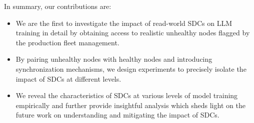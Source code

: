 In summary, our contributions are:
\begin{itemize}
    \item We are the first to investigate the impact of read-world SDCs on LLM training in detail by obtaining access to realistic unhealthy nodes flagged by the production fleet management.
    \item By pairing unhealthy nodes with healthy nodes and introducing synchronization mechanisms, we design experiments to precisely isolate the impact of SDCs at different levels.
    \item We reveal the characteristics of SDCs at various levels of model training empirically and further provide insightful analysis which sheds light on the future work on understanding and mitigating the impact of SDCs.
\end{itemize}

 

